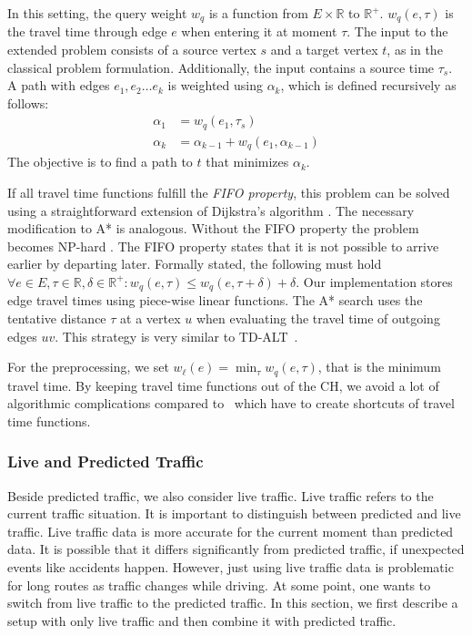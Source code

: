 \documentclass[manuscript,review]{acmart}
\begin{document}
In this setting, the query weight $w_q$ is a function from $E\times \mathbb{R}$ to $\mathbb{R}^+$.
$w_q(e, \tau)$ is the travel time through edge $e$ when entering it at moment $\tau$.
The input to the extended problem consists of a source vertex $s$ and a target vertex $t$, as in the classical problem formulation.
Additionally, the input contains a source time $\tau_s$.
A path with edges $e_1,e_2\ldots e_k$ is weighted using $\alpha_k$, which is defined recursively as follows:\[
\begin{split}
\alpha_{1} & = w_q(e_1, \tau_s) \\
\alpha_{k} & = \alpha_{k-1} + w_q(e_1, \alpha_{k-1})
\end{split}
\]
The objective is to find a path to $t$ that minimizes $\alpha_k$.

If all travel time functions fulfill the \emph{FIFO property}, this problem can be solved using a straightforward extension of Dijkstra's algorithm \cite{d-aassp-69}.
The necessary modification to A* is analogous.
Without the FIFO property the problem becomes NP-hard \cite{or-tnp-89}.
The FIFO property states that it is not possible to arrive earlier by departing later.
Formally stated, the following must hold $\forall e\in E,\tau\in \mathbb{R},\delta\in \mathbb{R}^+: w_q(e, \tau) \le w_q(e, \tau+\delta) + \delta$.
Our implementation stores edge travel times using piece-wise linear functions.
The A* search uses the tentative distance $\tau$ at a vertex $u$ when evaluating the travel time of outgoing edges $u v$.
This strategy is very similar to TD-ALT~\cite{ndls-bastd-12,dw-lbrdg-07}.

For the preprocessing, we set $w_\ell(e) = \min_\tau w_q(e,\tau)$, that is the minimum travel time.
By keeping travel time functions out of the CH, we avoid a lot of algorithmic complications compared to~\cite{bgsv-mtdtt-13,bdpw-dtdrp-16,swz-sfert-21,dn-crdtd-12} which have to create shortcuts of travel time functions.

\subsubsection{Live and Predicted Traffic}
\label{sec:live-predicted-traffic}

Beside predicted traffic, we also consider live traffic.
Live traffic refers to the current traffic situation.
It is important to distinguish between predicted and live traffic.
Live traffic data is more accurate for the current moment than predicted data.
It is possible that it differs significantly from predicted traffic, if unexpected events like accidents happen.
However, just using live traffic data is problematic for long routes as traffic changes while driving.
At some point, one wants to switch from live traffic to the predicted traffic.
In this section, we first describe a setup with only live traffic and then combine it with predicted traffic.
\end{document}
